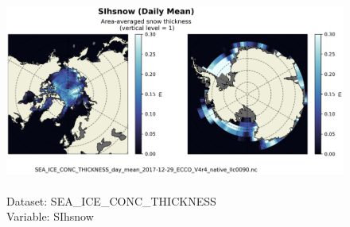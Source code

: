 \begin{figure}[H]
\centering
\includegraphics[scale=0.5]{../images/plots/native_plots/Sea-Ice_and_Snow_Concentration_and_Thickness/SIhsnow.png}
\caption{\\Dataset: SEA\_ICE\_CONC\_THICKNESS\\Variable: SIhsnow}
\label{tab:table-SEA_ICE_CONC_THICKNESS_SIhsnow-Plot}
\end{figure}
\pagebreak
